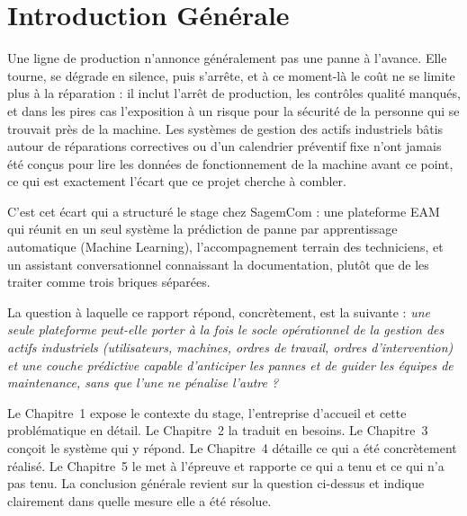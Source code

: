 \chapter*{Introduction Générale}

Une ligne de production n'annonce généralement pas une panne à l'avance. Elle tourne, se dégrade en silence, puis s'arrête, et à ce moment-là le coût ne se limite plus à la réparation : il inclut l'arrêt de production, les contrôles qualité manqués, et dans les pires cas l'exposition à un risque pour la sécurité de la personne qui se trouvait près de la machine. Les systèmes de gestion des actifs industriels bâtis autour de réparations correctives ou d'un calendrier préventif fixe n'ont jamais été conçus pour lire les données de fonctionnement de la machine avant ce point, ce qui est exactement l'écart que ce projet cherche à combler.

C'est cet écart qui a structuré le stage chez SagemCom : une plateforme EAM qui réunit en un seul système la prédiction de panne par apprentissage automatique (Machine Learning), l'accompagnement terrain des techniciens, et un assistant conversationnel connaissant la documentation, plutôt que de les traiter comme trois briques séparées.

La question à laquelle ce rapport répond, concrètement, est la suivante : \emph{une seule plateforme peut-elle porter à la fois le socle opérationnel de la gestion des actifs industriels (utilisateurs, machines, ordres de travail, ordres d'intervention) et une couche prédictive capable d'anticiper les pannes et de guider les équipes de maintenance, sans que l'une ne pénalise l'autre ?}

Le Chapitre~1 expose le contexte du stage, l'entreprise d'accueil et cette problématique en détail. Le Chapitre~2 la traduit en besoins. Le Chapitre~3 conçoit le système qui y répond. Le Chapitre~4 détaille ce qui a été concrètement réalisé. Le Chapitre~5 le met à l'épreuve et rapporte ce qui a tenu et ce qui n'a pas tenu. La conclusion générale revient sur la question ci-dessus et indique clairement dans quelle mesure elle a été résolue.
